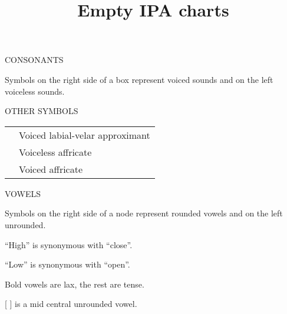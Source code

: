 \documentclass{article}
\title{Empty IPA charts}
\date{}
\newcommand{\headspace}{0.4cm}
\begin{document}
  \maketitle
  CONSONANTS

  \vspace{\headspace}

  \begin{adjustbox}{width=\textwidth}
    
  \end{adjustbox}

  {\tiny *Symbols on the right side of a box represent voiced sounds and on the left voiceless sounds.}

  \vspace{2cm}

  \parbox[l]{0.5\textwidth}{
    OTHER SYMBOLS

    \vspace{\headspace}

    \begin{adjustbox}{width=0.4\textwidth}
      \begin{tabular}{c l}
           & Voiced labial-velar approximant \\
           & Voiceless affricate \\
           & Voiced affricate
      \end{tabular}
    \end{adjustbox}
  }
  \parbox[r]{0.5\textwidth}{
    VOWELS

    \vspace{\headspace}

    \begin{adjustbox}{width=0.4\textwidth}
      
    \end{adjustbox}
  }

  \begin{flushright}
    {\tiny
      Symbols on the right side of a node represent rounded vowels and on the left unrounded.

      ``High'' is synonymous with ``close''.

      ``Low'' is synonymous with ``open''.

      Bold vowels are lax, the rest are tense.

      {[} ] is a mid central unrounded vowel.
    }
  \end{flushright}
\end{document}
